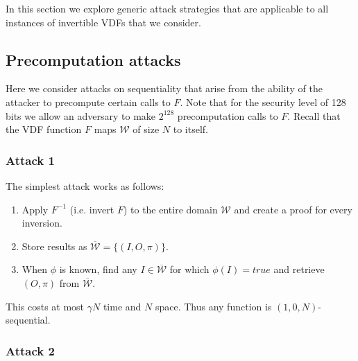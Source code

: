 \documentclass{article}
\begin{document}
In this section we explore generic attack strategies that are applicable to all instances of invertible VDFs that we consider.

\subsection{  Precomputation attacks}\label{sec:precomp}

Here we consider attacks on sequentiality that arise from the ability of the attacker to precompute certain calls to $F$. Note that for the security level of 128 bits we allow an adversary to make $2^{128}$ precomputation calls to $F$. Recall that the VDF function $F$ maps $\mathcal{W}$ of size $N$ to itself.

\subsubsection{Attack 1}

The simplest attack works as follows:
\begin{enumerate}
    \item Apply $F^{-1}$ (i.e. invert $F$) to the entire domain $\mathcal{W}$  and create a proof for every inversion.
    \item Store results as $\overline{\mathcal{W}}=\{(I,O,\pi)\}$.
    \item When $\phi$ is known, find any $I\in\overline{\mathcal{W}}$ for which $\phi(I)=true$ and retrieve $(O,\pi)$ from $\overline{\mathcal{W}}$.
\end{enumerate}
This costs at most $\gamma N$ time and $N$ space. Thus any function is $(1,0,N)$-sequential.

\subsubsection{Attack 2}
\end{document}
